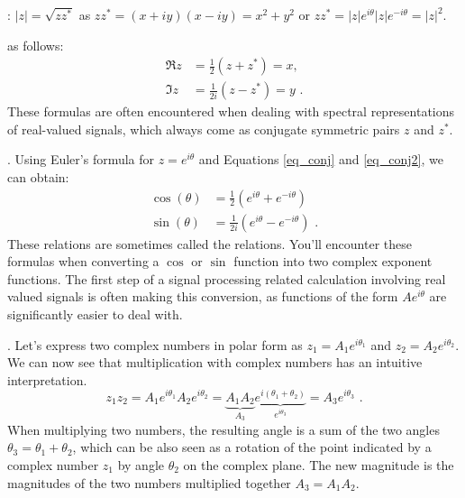 : $|z| = \sqrt{z z^*}$ as $zz^*=(x+iy)(x-iy)=x^2+y^2$
or $zz^* = |z|e^{i\theta}|z|e^{-i\theta}=|z|^2$.

 as follows:
\begin{align}
\Re{z} &= \frac{1}{2}(z+z^*)=x,  \label{eq_conj} \\
\Im{z} &= \frac{1}{2i}(z-z^*)=y \,\,. \label{eq_conj2}
\end{align}
These formulas are often encountered when dealing with spectral representations of real-valued signals, which always come as conjugate symmetric pairs $z$ and $z^*$.

. Using Euler's formula for $z=e^{i\theta}$ and Equations \ref{eq_conj} and \ref{eq_conj2}, we can obtain:
\begin{align}
\cos(\theta) &= \frac{1}{2}\left(e^{i\theta} + e^{-i\theta}\right) \label{inveul0}\\
\sin(\theta) &= \frac{1}{2i}\left(e^{i\theta} - e^{-i\theta}\right)\,\,. \label{inveul}
\end{align}
These relations are sometimes called the \emph{} relations. You'll encounter these formulas when converting a $\cos$ or $\sin$ function into two complex exponent functions. The first step of a signal processing related calculation involving real valued signals is often making this conversion, as functions of the form $A e^{i\theta}$ are significantly easier to deal with.

. Let's express two complex numbers in polar form as $z_1=A_1e^{i\theta_1}$ and $z_2=A_2e^{i\theta_2}$. We can now see that multiplication with complex numbers has an intuitive interpretation.
\begin{equation}
z_1 z_2 = A_1 e^{i\theta_1} A_2 e^{i\theta_2} = \underbrace{A_1
A_2}_{A_3} \underbrace{e^{i(\theta_1 + \theta_2)}}_{e^{i\theta_3}} =
A_3 e^{i\theta_3} \,\,.
\end{equation}
When multiplying two numbers, the resulting angle is a sum of the two angles $\theta_3=\theta_1 + \theta_2$, which can be also seen as a rotation of the point indicated by a complex number $z_1$ by angle $\theta_2$ on the complex plane. The new magnitude is the magnitudes of the two numbers multiplied together $A_3=A_1A_2$.

